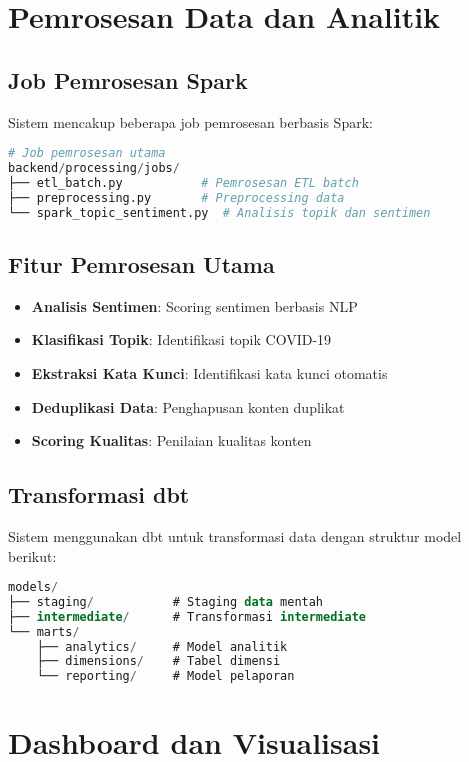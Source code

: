 \documentclass[12pt,a4paper]{article}
\begin{document}
\section{Pemrosesan Data dan Analitik}

\subsection{Job Pemrosesan Spark}
Sistem mencakup beberapa job pemrosesan berbasis Spark:

\begin{lstlisting}[language=python, caption=Struktur Job Spark]
# Job pemrosesan utama
backend/processing/jobs/
├── etl_batch.py           # Pemrosesan ETL batch
├── preprocessing.py       # Preprocessing data
└── spark_topic_sentiment.py  # Analisis topik dan sentimen
\end{lstlisting}

\subsection{Fitur Pemrosesan Utama}
\begin{itemize}
    \item \textbf{Analisis Sentimen}: Scoring sentimen berbasis NLP
    \item \textbf{Klasifikasi Topik}: Identifikasi topik COVID-19
    \item \textbf{Ekstraksi Kata Kunci}: Identifikasi kata kunci otomatis
    \item \textbf{Deduplikasi Data}: Penghapusan konten duplikat
    \item \textbf{Scoring Kualitas}: Penilaian kualitas konten
\end{itemize}

\subsection{Transformasi dbt}
Sistem menggunakan dbt untuk transformasi data dengan struktur model berikut:

\begin{lstlisting}[language=sql, caption=Struktur Model dbt]
models/
├── staging/           # Staging data mentah
├── intermediate/      # Transformasi intermediate
└── marts/
    ├── analytics/     # Model analitik
    ├── dimensions/    # Tabel dimensi
    └── reporting/     # Model pelaporan
\end{lstlisting}

\section{Dashboard dan Visualisasi}
\end{document}
